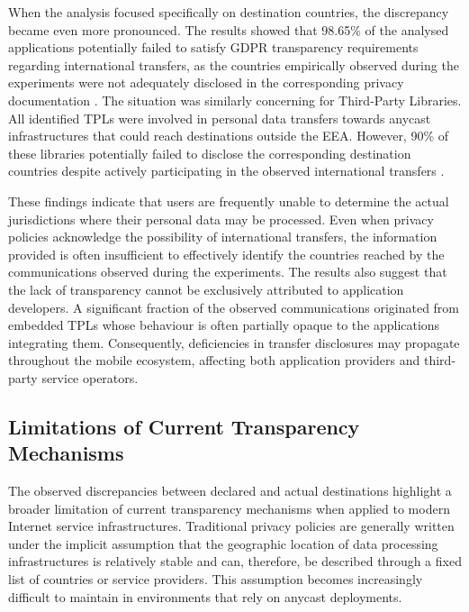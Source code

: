 When the analysis focused specifically on destination countries, the discrepancy became even more pronounced. The results showed that 98.65\% of the analysed applications potentially failed to satisfy GDPR transparency requirements regarding international transfers, as the countries empirically observed during the experiments were not adequately disclosed in the corresponding privacy documentation \cite{Pascual2025AnycastDisaster}. The situation was similarly concerning for Third-Party Libraries. All identified TPLs were involved in personal data transfers towards anycast infrastructures that could reach destinations outside the EEA. However, 90\% of these libraries potentially failed to disclose the corresponding destination countries despite actively participating in the observed international transfers \cite{Pascual2025AnycastDisaster}.

These findings indicate that users are frequently unable to determine the actual jurisdictions where their personal data may be processed. Even when privacy policies acknowledge the possibility of international transfers, the information provided is often insufficient to effectively identify the countries reached by the communications observed during the experiments. The results also suggest that the lack of transparency cannot be exclusively attributed to application developers. A significant fraction of the observed communications originated from embedded TPLs whose behaviour is often partially opaque to the applications integrating them. Consequently, deficiencies in transfer disclosures may propagate throughout the mobile ecosystem, affecting both application providers and third-party service operators.

\subsection{Limitations of Current Transparency Mechanisms}
\label{sc:anycast_experiments_transparency_limitations}

The observed discrepancies between declared and actual destinations highlight a broader limitation of current transparency mechanisms when applied to modern Internet service infrastructures. Traditional privacy policies are generally written under the implicit assumption that the geographic location of data processing infrastructures is relatively stable and can, therefore, be described through a fixed list of countries or service providers. This assumption becomes increasingly difficult to maintain in environments that rely on anycast deployments.

